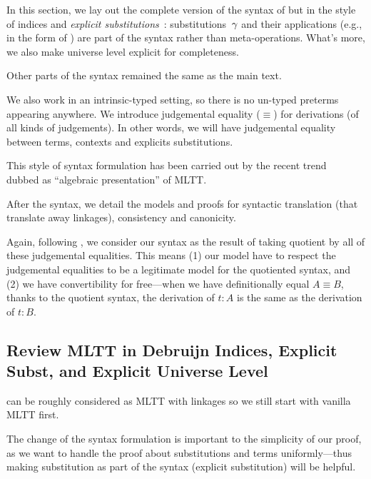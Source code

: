 In this section, we lay out the complete version of the syntax of \TT but in the style of \citeauthor{debruijn1964} indices and \emph{explicit substitutions}~\cite{substcalculus,abadi1989subst}:
substitutions~$\gamma$ and their applications (e.g., in the form of ) are part
of the syntax rather than meta-operations. What's more, we also make universe level explicit for completeness.

Other parts of the syntax remained the same as the main text.  

We also work in an intrinsic-typed setting, so there is no un-typed preterms appearing anywhere. We introduce judgemental equality ($\equiv$)
for derivations (of all kinds of judgements). In other words, we will have judgemental equality between terms, 
contexts and explicits substitutions. 

This style of syntax formulation has been carried out by the recent trend~\cite{altkap2016,coquand2018canonicity,gratzer-sterling-birkedal-2019} dubbed as ``algebraic presentation'' of MLTT. 


After the syntax, we detail the models and proofs for syntactic translation (that translate away linkages),  consistency and canonicity. 

Again, following \citet{altkap2016,coquand2018canonicity,gratzer-sterling-birkedal-2019}, we consider our syntax as the result of taking quotient by all of these judgemental equalities. This means 
(1) our model have to respect the judgemental equalities to be a legitimate model for the quotiented syntax, and (2) we have convertibility for free---when we have definitionally equal $A \equiv B$, thanks to the quotient syntax, the derivation of $t : A$ is the same as the derivation of $t : B$.


\subsection{Review MLTT in Debruijn Indices, Explicit Subst, and Explicit Universe Level}

\TT can be roughly considered as MLTT with linkages so we still start with vanilla MLTT first.




  The change of the syntax formulation is important to the simplicity of our proof, as we want to handle the proof about substitutions and terms uniformly---thus making substitution as part of the syntax (explicit substitution) will be helpful. 

